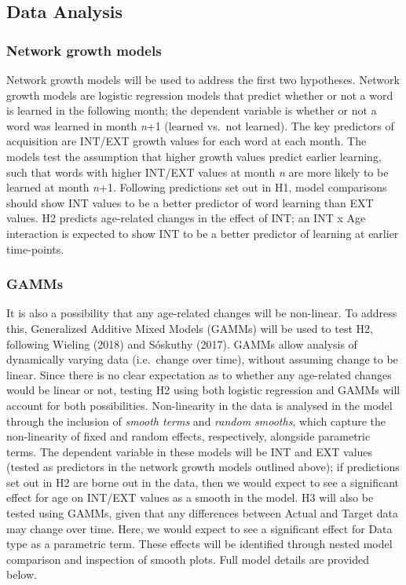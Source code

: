 \documentclass[
  man]{apa6}
\begin{document}
\hypertarget{data-analysis}{%
\subsection{Data Analysis}\label{data-analysis}}

\hypertarget{network-growth-models}{%
\subsubsection{Network growth models}\label{network-growth-models}}

Network growth models will be used to address the first two hypotheses. Network growth models are logistic regression models that predict whether or not a word is learned in the following month; the dependent variable is whether or not a word was learned in month \emph{n}+1 (learned vs.~not learned). The key predictors of acquisition are INT/EXT growth values for each word at each month. The models test the assumption that higher growth values predict earlier learning, such that words with higher INT/EXT values at month \emph{n} are more likely to be learned at month \emph{n}+1. Following predictions set out in H1, model comparisons should show INT values to be a better predictor of word learning than EXT values. H2 predicts age-related changes in the effect of INT; an INT x Age interaction is expected to show INT to be a better predictor of learning at earlier time-points.

\hypertarget{gamms}{%
\subsubsection{GAMMs}\label{gamms}}

It is also a possibility that any age-related changes will be non-linear. To address this, Generalized Additive Mixed Models (GAMMs) will be used to test H2, following Wieling (2018) and Sóskuthy (2017). GAMMs allow analysis of dynamically varying data (i.e.~change over time), without assuming change to be linear. Since there is no clear expectation as to whether any age-related changes would be linear or not, testing H2 using both logistic regression and GAMMs will account for both possibilities. Non-linearity in the data is analysed in the model through the inclusion of \emph{smooth terms} and \emph{random smooths}, which capture the non-linearity of fixed and random effects, respectively, alongside parametric terms. The dependent variable in these models will be INT and EXT values (tested as predictors in the network growth models outlined above); if predictions set out in H2 are borne out in the data, then we would expect to see a significant effect for age on INT/EXT values as a smooth in the model. H3 will also be tested using GAMMs, given that any differences between Actual and Target data may change over time. Here, we would expect to see a significant effect for Data type as a parametric term. These effects will be identified through nested model comparison and inspection of smooth plots. Full model details are provided below.
\end{document}
